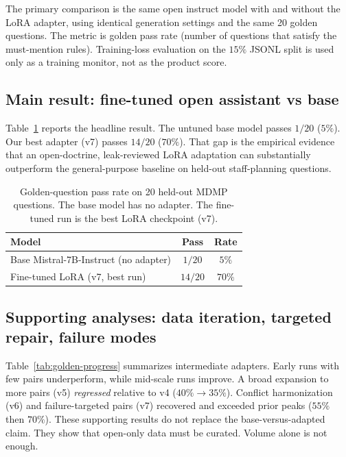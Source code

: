 \documentclass[11pt]{article}
\begin{document}
The primary comparison is the same open instruct model with and without the
LoRA adapter, using identical generation settings and the same 20 golden
questions.
The metric is golden pass rate (number of questions that satisfy the
must-mention rules).
Training-loss evaluation on the $15\%$ JSONL split is used only as a training
monitor, not as the product score.

\subsection{Main result: fine-tuned open assistant vs base}
\label{sec:results-main}

Table~\ref{tab:golden-main} reports the headline result.
The untuned base model passes $1/20$ ($5\%$).
Our best adapter (v7) passes $14/20$ ($70\%$).
That gap is the empirical evidence that an open-doctrine, leak-reviewed LoRA
adaptation can substantially outperform the general-purpose baseline on
held-out staff-planning questions.

\begin{table}[t]
  \centering
  \caption{Golden-question pass rate on 20 held-out MDMP questions.
  The base model has no adapter. The fine-tuned run is the best LoRA checkpoint (v7).}
  \label{tab:golden-main}
  \begin{tabular}{lcc}
    \toprule
    Model & Pass & Rate \\
    \midrule
    Base Mistral-7B-Instruct (no adapter) & $1/20$ & $5\%$ \\
    Fine-tuned LoRA (v7, best run) & $14/20$ & $70\%$ \\
    \bottomrule
  \end{tabular}
\end{table}

\subsection{Supporting analyses: data iteration, targeted repair, failure modes}
\label{sec:results-support}

Table~\ref{tab:golden-progress} summarizes intermediate adapters.
Early runs with few pairs underperform, while mid-scale runs improve.
A broad expansion to more pairs (v5) \emph{regressed} relative to v4
($40\%\rightarrow 35\%$).
Conflict harmonization (v6) and failure-targeted pairs (v7) recovered and
exceeded prior peaks ($55\%$ then $70\%$).
These supporting results do not replace the base-versus-adapted claim.
They show that open-only data must be curated.
Volume alone is not enough.
\end{document}
